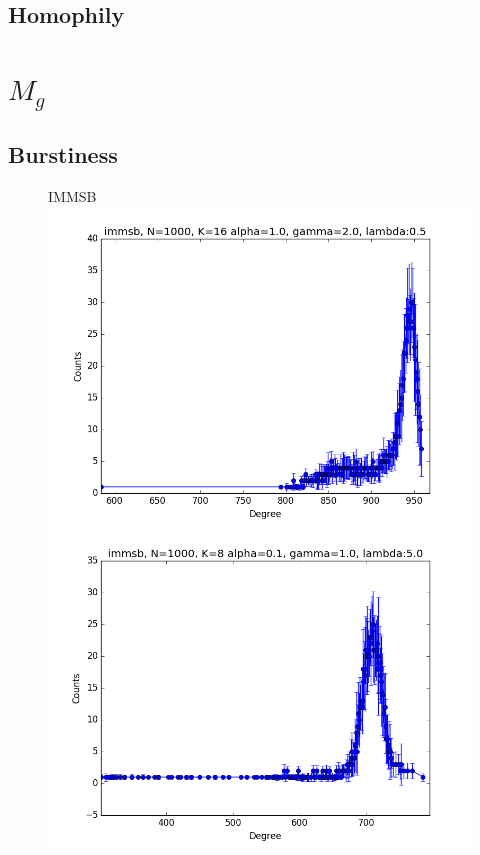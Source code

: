 \documentclass[a4paper, 12pt]{article}
\begin{document}
\clearpage

\subsection{Homophily}

\clearpage
\section{$M_g$}

\subsection{Burstiness}


\begin{figure}[ht]
    \vspace{-3cm}
	\centering IMMSB\\
	\includegraphics[scale=0.27]{img/M_g_peaks/figure_1}
	\endminipage
	\includegraphics[scale=0.27]{img/M_g_power_law/figure_1}

\end{figure}
\end{document}
